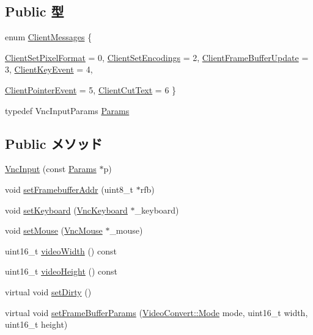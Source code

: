 \subsection*{Public 型}
\begin{DoxyCompactItemize}
\item 
enum \hyperlink{classVncInput_a58b5b2aadaeafc265dec196e8868cacd}{ClientMessages} \{ \par
\hyperlink{classVncInput_a58b5b2aadaeafc265dec196e8868cacda255292f4d9e524e15ff62e8033ddcaf5}{ClientSetPixelFormat} =  0, 
\hyperlink{classVncInput_a58b5b2aadaeafc265dec196e8868cacdaa89fc9bca1b3c104d1b1d4e363c7a35c}{ClientSetEncodings} =  2, 
\hyperlink{classVncInput_a58b5b2aadaeafc265dec196e8868cacda2a5859ccdbbeec19483aa0c10403ac3a}{ClientFrameBufferUpdate} =  3, 
\hyperlink{classVncInput_a58b5b2aadaeafc265dec196e8868cacda20b91df2df74ddf80c0608d5919be1b3}{ClientKeyEvent} =  4, 
\par
\hyperlink{classVncInput_a58b5b2aadaeafc265dec196e8868cacdabf768f748337c98b90d1ff88a0182a38}{ClientPointerEvent} =  5, 
\hyperlink{classVncInput_a58b5b2aadaeafc265dec196e8868cacda6ce5edbf9a7674d935c30c974af50696}{ClientCutText} =  6
 \}
\item 
typedef VncInputParams \hyperlink{classVncInput_a33249bc76b6a23eda274363d6f466b79}{Params}
\end{DoxyCompactItemize}
\subsection*{Public メソッド}
\begin{DoxyCompactItemize}
\item 
\hyperlink{classVncInput_aa1f9aa1c07faf127e4006b0ab3369039}{VncInput} (const \hyperlink{classVncInput_a33249bc76b6a23eda274363d6f466b79}{Params} $\ast$p)
\item 
void \hyperlink{classVncInput_a54024497bf1e639ca5a4534d43329c0d}{setFramebufferAddr} (uint8\_\-t $\ast$rfb)
\item 
void \hyperlink{classVncInput_aaff23abd4e2f23c182ad8b3eec7e346d}{setKeyboard} (\hyperlink{classVncKeyboard}{VncKeyboard} $\ast$\_\-keyboard)
\item 
void \hyperlink{classVncInput_a72219b1c8621f5be92c7217c0cea3834}{setMouse} (\hyperlink{classVncMouse}{VncMouse} $\ast$\_\-mouse)
\item 
uint16\_\-t \hyperlink{classVncInput_ab1e9571fac3dd138effbc19ec81536ce}{videoWidth} () const 
\item 
uint16\_\-t \hyperlink{classVncInput_aba9f8788e70eacd6c454abfe49de9c3c}{videoHeight} () const 
\item 
virtual void \hyperlink{classVncInput_ad7eac728ea55298c7691e7d1c165719b}{setDirty} ()
\item 
virtual void \hyperlink{classVncInput_a9abef13e07371ccf4a89883649f1bcc5}{setFrameBufferParams} (\hyperlink{classVideoConvert_a46c8a310cf4c094f8c80e1cb8dc1f911}{VideoConvert::Mode} mode, uint16\_\-t width, uint16\_\-t height)
\end{DoxyCompactItemize}
